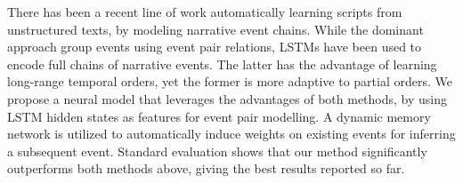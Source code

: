 There has been a recent line of work automatically learning scripts from unstructured texts, by modeling narrative event chains. While the dominant approach group events using event pair relations, LSTMs have been used to encode full chains of narrative events. The latter has the advantage of learning long-range temporal orders, yet the former is more adaptive to partial orders. We propose a neural model that leverages the advantages of both methods, by using LSTM hidden states as features for event pair modelling. A dynamic memory network is utilized to automatically induce weights on existing events for inferring a subsequent event. Standard evaluation shows that our method significantly outperforms both methods above, giving the best results reported so far.
